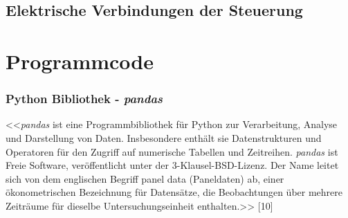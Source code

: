 \begin{appendix}
{{\subsection{Elektrische Verbindungen der Steuerung}

\label{section:_libraries_py}

\section{Programmcode}


\label{main_src}


\label{ldd_src}

\subsubsection{Python Bibliothek - \textit{pandas}}
<<\textit{pandas} ist eine Programmbibliothek für Python zur Verarbeitung, Analyse und Darstellung von Daten. Insbesondere enthält sie Datenstrukturen und Operatoren für den Zugriff auf numerische Tabellen und Zeitreihen. \textit{pandas} ist Freie Software, veröffentlicht unter der 3-Klausel-BSD-Lizenz. Der Name leitet sich von dem englischen Begriff panel data (Paneldaten) ab, einer ökonometrischen Bezeichnung für Datensätze, die Beobachtungen über mehrere Zeiträume für dieselbe Untersuchungseinheit enthalten.>> [10]

}}
\end{appendix}
